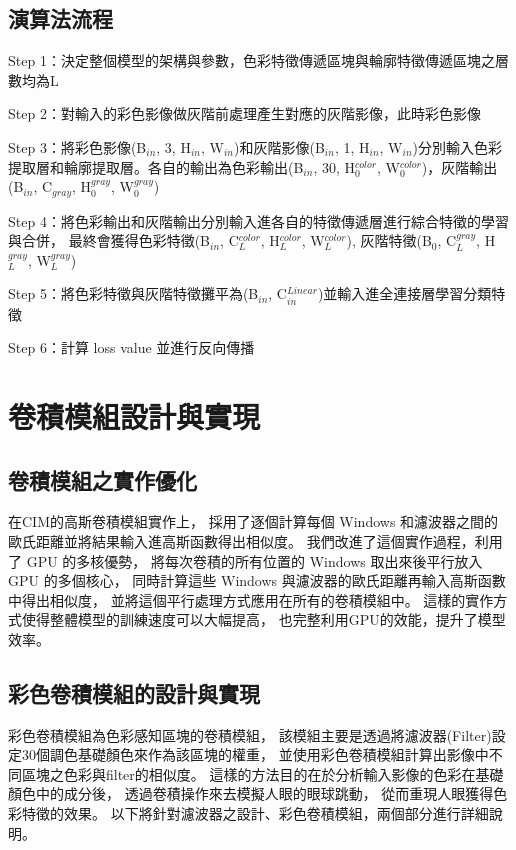 \documentclass[class=NCU_thesis, crop=false]{standalone}
\begin{document}
\subsection{演算法流程}
Step 1：決定整個模型的架構與參數，色彩特徵傳遞區塊與輪廓特徵傳遞區塊之層數均為L

Step 2：對輸入的彩色影像做灰階前處理產生對應的灰階影像，此時彩色影像

Step 3：將彩色影像(B$_{in}$, 3, H$_{in}$, W$_{in}$)和灰階影像(B$_{in}$, 1, H$_{in}$, W$_{in}$)分別輸入色彩提取層和輪廓提取層。各自的輸出為色彩輸出(B$_{in}$, 30, H$^{color}_{0}$, W$^{color}_{0}$)，灰階輸出(B$_{in}$, C${_{gray}}$, H$^{gray}_{0}$, W$^{gray}_{0}$)

Step 4：將色彩輸出和灰階輸出分別輸入進各自的特徵傳遞層進行綜合特徵的學習與合併，
		最終會獲得色彩特徵(B$_{in}$, C$^{color}_{L}$, H$^{color}_{L}$, W$^{color}_{L}$), 灰階特徵(B$_{0}$, C$^{gray}_{L}$, H$^{gray}_{L}$, W$^{gray}_{L}$)

Step 5：將色彩特徵與灰階特徵攤平為(B$_{in}$, C$^{Linear}_{in}$)並輸入進全連接層學習分類特徵

Step 6：計算 loss value 並進行反向傳播

\pagebreak


\section{卷積模組設計與實現}
	\subsection{卷積模組之實作優化}
		在CIM的高斯卷積模組實作上，
		採用了逐個計算每個 Windows 和濾波器之間的歐氏距離並將結果輸入進高斯函數得出相似度。
		我們改進了這個實作過程，利用了 GPU 的多核優勢，
		將每次卷積的所有位置的 Windows 取出來後平行放入 GPU 的多個核心，
		同時計算這些 Windows 與濾波器的歐氏距離再輸入高斯函數中得出相似度，
		並將這個平行處理方式應用在所有的卷積模組中。
		這樣的實作方式使得整體模型的訓練速度可以大幅提高，
		也完整利用GPU的效能，提升了模型效率。

	\subsection{彩色卷積模組的設計與實現}
		彩色卷積模組為色彩感知區塊的卷積模組，
		該模組主要是透過將濾波器(Filter)設定30個調色基礎顏色來作為該區塊的權重，
		並使用彩色卷積模組計算出影像中不同區塊之色彩與filter的相似度。
		這樣的方法目的在於分析輸入影像的色彩在基礎顏色中的成分後，
		透過卷積操作來去模擬人眼的眼球跳動，
		從而重現人眼獲得色彩特徵的效果。
		以下將針對濾波器之設計、彩色卷積模組，兩個部分進行詳細說明。
		\pagebreak
		
\end{document}
